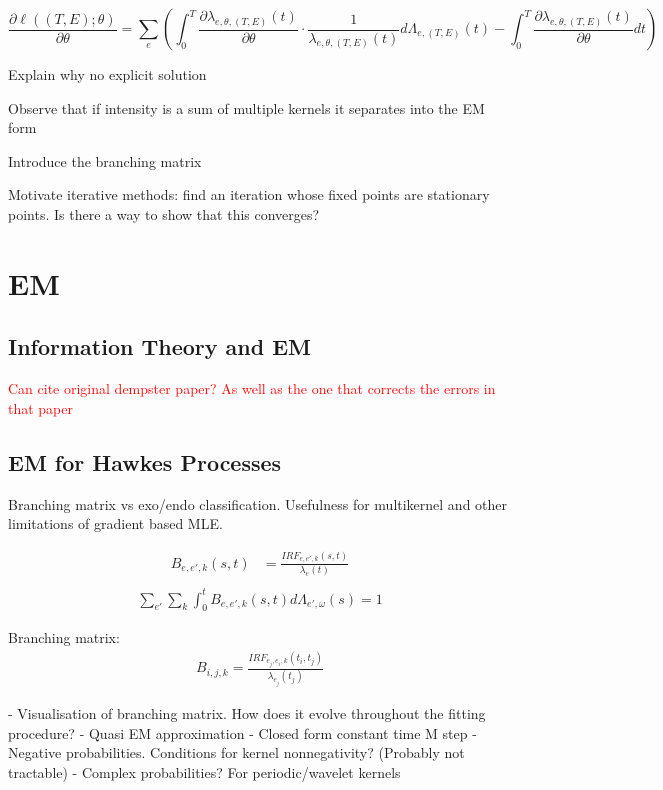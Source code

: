 \documentclass[honours,12pt]{unswthesis}
\numberwithin{equation}{section}
\begin{document}
$$\frac{\partial \ell((T,E);\theta)}{\partial \theta} = \sum_{e}\left(\int_0^T \frac{\partial \lambda_{e,\theta,(T,E)}(t)}{\partial \theta}\cdot\frac{1}{\lambda_{e,\theta,(T,E)}(t)}d\Lambda_{e,(T,E)}(t) - \int_0^T \frac{\partial\lambda_{e,\theta,(T,E)}(t)}{\partial \theta}dt\right)$$

Explain why no explicit solution

Observe that if intensity is a sum of multiple kernels it separates into the EM form

Introduce the branching matrix

Motivate iterative methods: find an iteration whose fixed points are stationary points. Is there a way to show that this converges?

\section{EM}

\subsection{Information Theory and EM}
\textcolor{red}{Can cite original dempster paper? As well as the one that corrects the errors in that paper}

\subsection{EM for Hawkes Processes}
Branching matrix vs exo/endo classification. Usefulness for multikernel and other limitations of gradient based MLE.

\begin{align*}
	B_{e,e',k}(s,t)
	&= \frac{IRF_{e,e',k}(s,t)}{\lambda_{e}(t)} \\
\end{align*}
\begin{align*}
	\sum_{e'} \sum_{k} \int_0^t B_{e,e',k}(s,t)d\Lambda_{e',\omega}(s) = 1
\end{align*}

Branching matrix:
\begin{align*}
	B_{i,j,k} = \frac{IRF_{e_j,e_i,k}(t_i,t_j)}{\lambda_{e_j}(t_j)}
\end{align*}

- Visualisation of branching matrix. How does it evolve throughout the fitting procedure?
- Quasi EM approximation
- Closed form constant time M step
- Negative probabilities. Conditions for kernel nonnegativity? (Probably not tractable)
- Complex probabilities? For periodic/wavelet kernels
\end{document}
